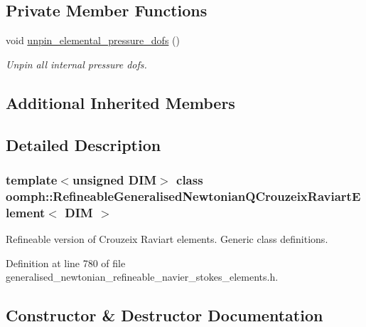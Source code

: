 \subsection*{Private Member Functions}
\begin{DoxyCompactItemize}
\item 
void \hyperlink{classoomph_1_1RefineableGeneralisedNewtonianQCrouzeixRaviartElement_a5f0ca1585eef5cae43ea9eafde474991}{unpin\+\_\+elemental\+\_\+pressure\+\_\+dofs} ()
\begin{DoxyCompactList}\small\item\em Unpin all internal pressure dofs. \end{DoxyCompactList}\end{DoxyCompactItemize}
\subsection*{Additional Inherited Members}


\subsection{Detailed Description}
\subsubsection*{template$<$unsigned D\+IM$>$\newline
class oomph\+::\+Refineable\+Generalised\+Newtonian\+Q\+Crouzeix\+Raviart\+Element$<$ D\+I\+M $>$}

Refineable version of Crouzeix Raviart elements. Generic class definitions. 

Definition at line 780 of file generalised\+\_\+newtonian\+\_\+refineable\+\_\+navier\+\_\+stokes\+\_\+elements.\+h.



\subsection{Constructor \& Destructor Documentation}
\mbox{\label{classoomph_1_1RefineableGeneralisedNewtonianQCrouzeixRaviartElement_a82a4fe5c2a152603bc51391de33d921c}} 
